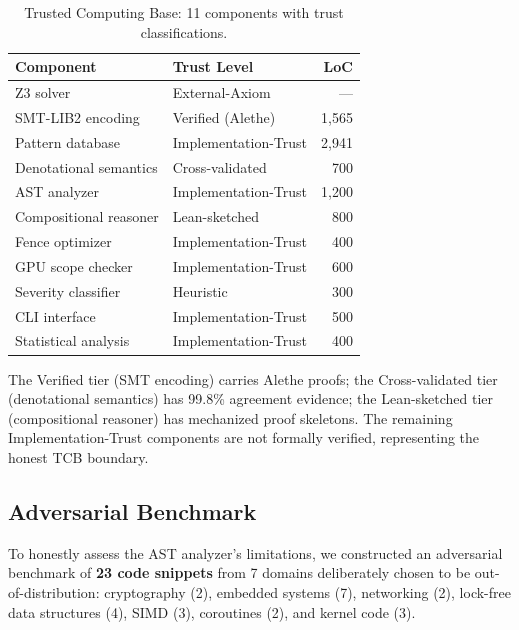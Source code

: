 \documentclass[11pt]{article}
\begin{document}
\begin{table}[ht]
\centering
\caption{Trusted Computing Base: 11 components with trust classifications.}
\label{tab:tcb}
\small
\begin{tabular}{llr}
\toprule
\textbf{Component} & \textbf{Trust Level} & \textbf{LoC} \\
\midrule
Z3 solver               & External-Axiom  & --- \\
SMT-LIB2 encoding       & Verified (Alethe) & 1{,}565 \\
Pattern database         & Implementation-Trust & 2{,}941 \\
Denotational semantics   & Cross-validated & 700 \\
AST analyzer             & Implementation-Trust & 1{,}200 \\
Compositional reasoner   & Lean-sketched & 800 \\
Fence optimizer          & Implementation-Trust & 400 \\
GPU scope checker        & Implementation-Trust & 600 \\
Severity classifier      & Heuristic & 300 \\
CLI interface            & Implementation-Trust & 500 \\
Statistical analysis     & Implementation-Trust & 400 \\
\bottomrule
\end{tabular}
\end{table}

\noindent
The Verified tier (SMT encoding) carries Alethe proofs;
the Cross-validated tier (denotational semantics) has 99.8\%
agreement evidence; the Lean-sketched tier (compositional reasoner)
has mechanized proof skeletons.  The remaining Implementation-Trust
components are not formally verified, representing the honest TCB boundary.

\subsection{Adversarial Benchmark}
\label{sec:adversarial-benchmark}

To honestly assess the AST analyzer's limitations,
we constructed an adversarial benchmark of \textbf{23 code snippets}
from 7 domains deliberately chosen to be out-of-distribution:
cryptography (2), embedded systems (7), networking (2),
lock-free data structures (4), SIMD (3), coroutines (2),
and kernel code (3).
\end{document}

